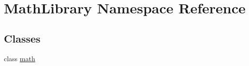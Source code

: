 \hypertarget{namespace_math_library}{}\section{Math\+Library Namespace Reference}
\label{namespace_math_library}
\subsection*{Classes}
\begin{DoxyCompactItemize}
\item 
class \mbox{\hyperlink{class_math_library_1_1math}{math}}
\end{DoxyCompactItemize}
